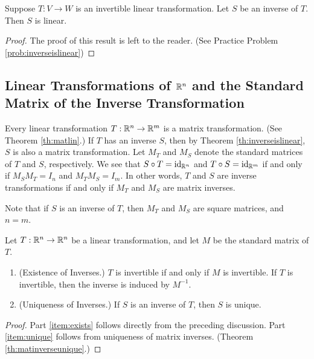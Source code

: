 \documentclass{ximera}
\begin{document}
\begin{theorem}\label{th:inverseislinear} Suppose $T:V\rightarrow W$ is an invertible linear transformation.  Let $S$ be an inverse of $T$.  Then $S$ is  linear.
\end{theorem}

\begin{proof} The proof of this result is left to the reader. (See Practice Problem \ref{prob:inverseislinear})
\end{proof}


\subsection*{Linear Transformations of $\mathbb{R}^n$ and the Standard Matrix of the Inverse Transformation}

Every linear transformation $T:\mathbb{R}^n\rightarrow\mathbb{R}^m$ is a matrix transformation. (See Theorem \ref{th:matlin}.)  If $T$ has an inverse $S$, then by Theorem \ref{th:inverseislinear}, $S$ is also a matrix transformation.  Let  $M_T$ and $M_S$ denote the standard matrices of $T$ and $S$, respectively.  We see that $S\circ T=\text{id}_{\mathbb{R}^n}$ and $T\circ S=\text{id}_{\mathbb{R}^m}$ if and only if $M_SM_T=I_{n}$ and $M_TM_S=I_{m}$.  In other words, $T$ and $S$ are inverse transformations if and only if $M_T$ and $M_S$ are matrix inverses.

Note that if $S$ is an inverse of $T$, then $M_T$ and $M_S$ are square matrices, and $n=m$. 

\begin{theorem}\label{th:existunique} Let $T:\mathbb{R}^n\rightarrow \mathbb{R}^n$ be a linear transformation, and let $M$ be the standard matrix of $T$.
  \begin{enumerate}
  \item \label{item:exists} (Existence of Inverses.)  $T$ is invertible if and only if $M$ is invertible.  If $T$ is invertible, then the inverse is induced by $M^{-1}$.
  \item \label{item:unique} (Uniqueness of Inverses.)  If $S$ is an inverse of $T$, then $S$ is unique.
  \end{enumerate}
\end{theorem}
\begin{proof}
Part \ref{item:exists} follows directly from the preceding discussion.  Part \ref{item:unique} follows from uniqueness of matrix inverses. (Theorem \ref{th:matinverseunique}.)
\end{proof}
\end{document}

